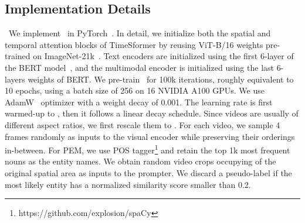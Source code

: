 \documentclass[10pt,twocolumn,letterpaper]{article}
\begin{document}
\subsection{Implementation Details}\label{sec:method-impl}~We implement \name~in PyTorch~\cite{paszke2019pytorch}.
In detail, we initialize both the spatial and temporal attention blocks of TimeSformer by reusing ViT-B/16 weights pre-trained on ImageNet-21k~\cite{dosovitskiy2020image}.
Text encoders are initialized using the first 6-layer of the BERT model~\cite{devlin2018bert}, and the multimodal encoder is initialized using the last 6-layers weights of BERT.
We pre-train \name~for 100k iterations, roughly equivalent to 10 epochs, using a batch size of 256 on 16 NVIDIA A100 GPUs.
We use AdamW~\cite{adamw2018} optimizer with a weight decay of 0.001. The learning rate is first warmed-up to , then it follows a linear decay schedule.
Since videos are usually of different aspect ratios, we first rescale them to .
For each video, we sample 4 frames randomly as inputs to the visual encoder while preserving their orderings in-between.
For PEM, we use POS tagger\footnote{https://github.com/explosion/spaCy} and retain the top 1k most frequent nouns as the entity names.
We obtain random video crops occupying  of the original spatial area as inputs to the prompter. We discard a pseudo-label if the most likely entity has a normalized similarity score smaller than 0.2.
\end{document}
